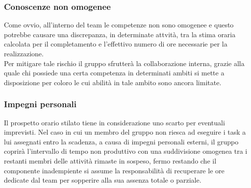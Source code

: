 \subsubsection{Conoscenze non omogenee}
Come ovvio, all'interno del team le competenze non sono omogenee e questo potrebbe causare una discrepanza, in determinate attvità, tra la stima oraria calcolata per il completamento e l'effettivo numero di ore necessarie per la realizzazione.
\\
Per mitigare tale rischio il gruppo sfrutterà la collaborazione interna, grazie alla quale chi possiede una certa competenza in determinati ambiti si mette a disposizione per coloro le cui abilità in tale ambito sono ancora limitate. 

\subsubsection{Impegni personali}
Il prospetto orario stilato tiene in considerazione uno scarto per eventuali imprevisti.
Nel caso in cui un membro del gruppo non riesca ad eseguire i task a lui assegnati entro la scadenza, a causa di impegni personali esterni, il gruppo coprirà l'intervallo di tempo non produttivo con una suddivisione omogenea tra i restanti membri delle attività rimaste in sospeso, fermo restando che il componente inadempiente si assume la responsabilità di recuperare le ore dedicate dal team per sopperire alla sua assenza totale o parziale.



